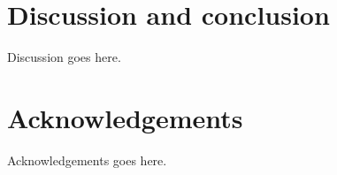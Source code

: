 \documentclass[aps,prd,twocolumn,superscriptaddress,amsfont,amssymb,amsmath,nofootinbib,showpacs,balancelastpage]{revtex4-1}
\begin{document}
\section{Discussion and conclusion}\label{sec.discussion}
Discussion goes here.

\section*{Acknowledgements}
Acknowledgements goes here.

%


\end{document}
